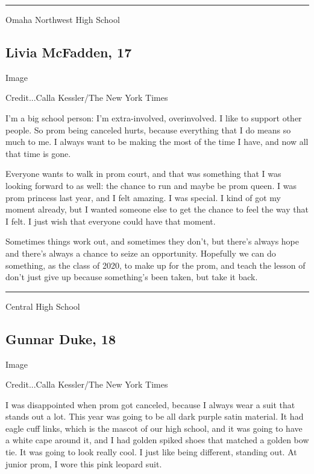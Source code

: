 \begin{center}\rule{0.5\linewidth}{\linethickness}\end{center}

Omaha Northwest High School

\hypertarget{livia-mcfadden-17}{%
\subsection{Livia McFadden, 17}\label{livia-mcfadden-17}}

Image

Credit...Calla Kessler/The New York Times

I'm a big school person: I'm extra-involved, overinvolved. I like to
support other people. So prom being canceled hurts, because everything
that I do means so much to me. I always want to be making the most of
the time I have, and now all that time is gone.

Everyone wants to walk in prom court, and that was something that I was
looking forward to as well: the chance to run and maybe be prom queen. I
was prom princess last year, and I felt amazing. I was special. I kind
of got my moment already, but I wanted someone else to get the chance to
feel the way that I felt. I just wish that everyone could have that
moment.

Sometimes things work out, and sometimes they don't, but there's always
hope and there's always a chance to seize an opportunity. Hopefully we
can do something, as the class of 2020, to make up for the prom, and
teach the lesson of don't just give up because something's been taken,
but take it back.

\begin{center}\rule{0.5\linewidth}{\linethickness}\end{center}

Central High School

\hypertarget{gunnar-duke-18}{%
\subsection{Gunnar Duke, 18}\label{gunnar-duke-18}}

Image

Credit...Calla Kessler/The New York Times

I was disappointed when prom got canceled, because I always wear a suit
that stands out a lot. This year was going to be all dark purple satin
material. It had eagle cuff links, which is the mascot of our high
school, and it was going to have a white cape around it, and I had
golden spiked shoes that matched a golden bow tie. It was going to look
really cool. I just like being different, standing out. At junior prom,
I wore this pink leopard suit.

